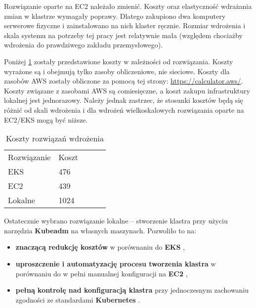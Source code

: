 Rozwiązanie oparte na EC2 należało zmienić. Koszty oraz elastyczność wdrażania zmian w klastrze wymagały poprawy. Dlatego zakupiono dwa komputery serwerowe fizyczne i zainstalowano na nich klaster ręcznie. Rozmiar wdrożenia i skala systemu na potrzeby tej pracy jest relatywnie mała (względem chociażby wdrożenia do prawdziwego zakładu przemysłowego).

Poniżej \ref{tab:koszty_rozwiazan_wdrazenia} zostały przedstawione koszty w zależności od rozwiązania. Koszty wyrażone są i obejmują tylko zasoby obliczeniowe, nie sieciowe. Koszty dla zasobów AWS zostały obliczone za pomocą tej strony: \url{https://calculator.aws/}. Koszty związane z zasobami AWS są comiesięczne, a koszt zakupu infrastruktury lokalnej jest jednorazowy. Należy jednak zastrzec, że stosunki kosztów będą się różnić od skali wdrożenia i dla wdrożeń wielkoskalowych rozwiązania oparte na EC2/EKS mogą być niższe.

\begin{table}[h]
    \centering
    \begin{tabular}{|l|l|lll}
    \cline{1-2}
    Rozwiązanie & Koszt &  &  &  \\ \cline{1-2}
    EKS         & 476   &  &  &  \\ \cline{1-2}
    EC2         & 439   &  &  &  \\ \cline{1-2}
    Lokalne     & 1024  &  &  &  \\ \cline{1-2}
    \end{tabular}
    \caption{Koszty rozwiązań wdrożenia}
    \label{tab:koszty_rozwiazan_wdrazenia}
\end{table}

\vspace{0.3em}

Ostatecznie wybrano rozwiązanie lokalne – stworzenie klastra przy użyciu narzędzia \textbf{Kubeadm} \cite{kubeadm_docs} na własnych maszynach. Pozwoliło to na:
\begin{itemize}
    \item \textbf{znaczącą redukcję kosztów} w porównaniu do \textbf{EKS} \cite{eks_docs},
    \item \textbf{uproszczenie i automatyzację procesu tworzenia klastra} w porównaniu do w pełni manualnej konfiguracji na \textbf{EC2} \cite{ec2_docs},
    \item \textbf{pełną kontrolę nad konfiguracją klastra} przy jednoczesnym zachowaniu zgodności ze standardami \textbf{Kubernetes} \cite{kubernetes}.
\end{itemize}

